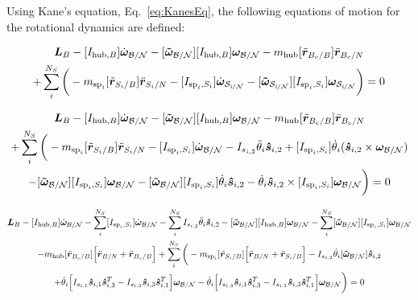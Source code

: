 \documentclass[paper]{aiaaNew}
\begin{document}
Using Kane's equation, Eq.~\eqref{eq:KanesEq}, the following equations of motion for the rotational dynamics are defined:

\begin{multline}
\bm L_B -[I_{\text{hub},B}] \dot{\bm\omega}_{\cal B/N}  -[\bm{\tilde{\omega}}_{\cal B/N}] [I_{\text{hub},B}] \bm\omega_{\cal B/N} - m_{\text{hub}} [\tilde{{\bm r}}_{B_c/B}] \ddot{\bm r}_{B_c/N} \\
+ \sum\limits_{i}^{N_S}\bigg(- m_{\text{sp}_i} [\tilde{{\bm r}}_{S_{i}/B}] \ddot{\bm r}_{S_{i}/N} -[I_{\text{sp}_i,S_i}] \dot{\bm\omega}_{\cal S_{\textit{i}/N}}  -[\bm{\tilde{\omega}}_{\cal S_{\textit{i}/N}}] [I_{\text{sp}_i,S_i}] \bm\omega_{\cal S_{\textit{i}/N}}\bigg) = 0
\end{multline}

\begin{multline}
\bm L_B -[I_{\text{hub},B}] \dot{\bm\omega}_{\cal B/N}  -[\bm{\tilde{\omega}}_{\cal B/N}] [I_{\text{hub},B}] \bm\omega_{\cal B/N} - m_{\text{hub}} [\tilde{{\bm r}}_{B_c/B}] \ddot{\bm r}_{B_c/N} \\
+ \sum\limits_{i}^{N_S}\bigg(- m_{\text{sp}_i} [\tilde{{\bm r}}_{S_{i}/B}] \ddot{\bm r}_{S_{i}/N} -[I_{\text{sp}_i,S_i}] \dot{\bm\omega}_{\cal B/N} - I_{s_{i,2}}\ddot{\theta}_i \bm{\hat{s}}_{i,2} + [I_{\text{sp}_i,S_i}] \dot{\theta}_i (\bm{\hat{s}}_{i,2} \times \bm\omega_{\cal B/N}) \\-[\bm{\tilde{\omega}}_{\cal B/N}] [I_{\text{sp}_i,S_i}] \bm\omega_{\cal B/N}
- [\bm{\tilde{\omega}}_{\cal B/N}] [I_{\text{sp}_i,S_i}] \dot{\theta}_i \bm{\hat{s}}_{i,2} -  \dot{\theta}_i \bm{\hat{s}}_{i,2} \times [I_{\text{sp}_i,S_i}] \bm\omega_{\cal B/N} \bigg) = 0
\end{multline}

\begin{multline}
\bm L_B -[I_{\text{hub},B}] \dot{\bm\omega}_{\cal B/N} - \sum\limits_{i}^{N_S}[I_{\text{sp}_i,S_i}] \dot{\bm\omega}_{\cal B/N} - \sum\limits_{i}^{N_S} I_{s_{i,2}}\ddot{\theta}_i \bm{\hat{s}}_{i,2} -[\bm{\tilde{\omega}}_{\cal B/N}] [I_{\text{hub},B}] \bm\omega_{\cal B/N} - \sum\limits_{i}^{N_S}[\bm{\tilde{\omega}}_{\cal B/N}] [I_{\text{sp}_i,S_i}] \bm\omega_{\cal B/N} \\- m_{\text{hub}} [\tilde{{\bm r}}_{B_c/B}] \Big[\ddot{\bm r}_{B/N} + \ddot{\bm r}_{B_c/B}\Big]
+ \sum\limits_{i}^{N_S}\bigg(- m_{\text{sp}_i} [\tilde{{\bm r}}_{S_{i}/B}] \Big[\ddot{\bm r}_{B/N} + \ddot{\bm r}_{S_{i}/B}\Big]
- I_{s_{i,2}} \dot{\theta}_i [\bm{\tilde{\omega}}_{\cal B/N}] \bm{\hat{s}}_{i,2} \\
+ \dot{\theta}_i \Big[I_{s_{i,1}}\bm{\hat{s}}_{i,1} \bm{\hat{s}}_{i,3}^T -  I_{s_{i,3}} \bm{\hat{s}}_{i,3} \bm{\hat{s}}_{i,1}^T\Big] \bm\omega_{\cal B/N} -  \dot{\theta}_i \Big[I_{s_{i,3}}\bm{\hat{s}}_{i,1} \bm{\hat{s}}_{i,3}^T -  I_{s_{i,1}} \bm{\hat{s}}_{i,3} \bm{\hat{s}}_{i,1}^T\Big] \bm\omega_{\cal B/N} \bigg) = 0
\end{multline}
\end{document}
